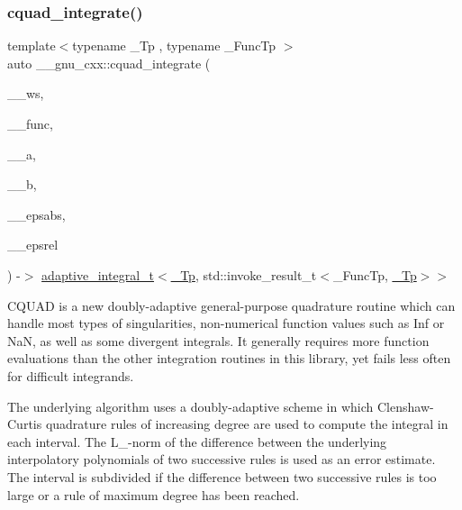 \subsubsection{\texorpdfstring{cquad\+\_\+integrate()}{cquad\_integrate()}}
{\footnotesize\ttfamily template$<$typename \+\_\+\+Tp , typename \+\_\+\+Func\+Tp $>$ \\
auto \+\_\+\+\_\+gnu\+\_\+cxx\+::cquad\+\_\+integrate (\begin{DoxyParamCaption}\item[{\hyperlink{struct____gnu__cxx_1_1cquad__workspace}{cquad\+\_\+workspace}$<$ \hyperlink{namespace____gnu__cxx_a3b19a9c800ca194374ef9172290f7d79}{\+\_\+\+Tp}, std\+::invoke\+\_\+result\+\_\+t$<$ \+\_\+\+Func\+Tp, \hyperlink{namespace____gnu__cxx_a3b19a9c800ca194374ef9172290f7d79}{\+\_\+\+Tp} $>$$>$ \&}]{\+\_\+\+\_\+ws,  }\item[{\+\_\+\+Func\+Tp}]{\+\_\+\+\_\+func,  }\item[{\hyperlink{namespace____gnu__cxx_a3b19a9c800ca194374ef9172290f7d79}{\+\_\+\+Tp}}]{\+\_\+\+\_\+a,  }\item[{\hyperlink{namespace____gnu__cxx_a3b19a9c800ca194374ef9172290f7d79}{\+\_\+\+Tp}}]{\+\_\+\+\_\+b,  }\item[{\hyperlink{namespace____gnu__cxx_a3b19a9c800ca194374ef9172290f7d79}{\+\_\+\+Tp}}]{\+\_\+\+\_\+epsabs,  }\item[{\hyperlink{namespace____gnu__cxx_a3b19a9c800ca194374ef9172290f7d79}{\+\_\+\+Tp}}]{\+\_\+\+\_\+epsrel }\end{DoxyParamCaption}) -\/$>$ \hyperlink{struct____gnu__cxx_1_1adaptive__integral__t}{adaptive\+\_\+integral\+\_\+t}$<$\hyperlink{namespace____gnu__cxx_a3b19a9c800ca194374ef9172290f7d79}{\+\_\+\+Tp}, std\+::invoke\+\_\+result\+\_\+t$<$\+\_\+\+Func\+Tp, \hyperlink{namespace____gnu__cxx_a3b19a9c800ca194374ef9172290f7d79}{\+\_\+\+Tp}$>$$>$
    }

C\+Q\+U\+AD is a new doubly-\/adaptive general-\/purpose quadrature routine which can handle most types of singularities, non-\/numerical function values such as Inf or NaN, as well as some divergent integrals. It generally requires more function evaluations than the other integration routines in this library, yet fails less often for difficult integrands.

The underlying algorithm uses a doubly-\/adaptive scheme in which Clenshaw-\/\+Curtis quadrature rules of increasing degree are used to compute the integral in each interval. The L\+\_-\/norm of the difference between the underlying interpolatory polynomials of two successive rules is used as an error estimate. The interval is subdivided if the difference between two successive rules is too large or a rule of maximum degree has been reached.

